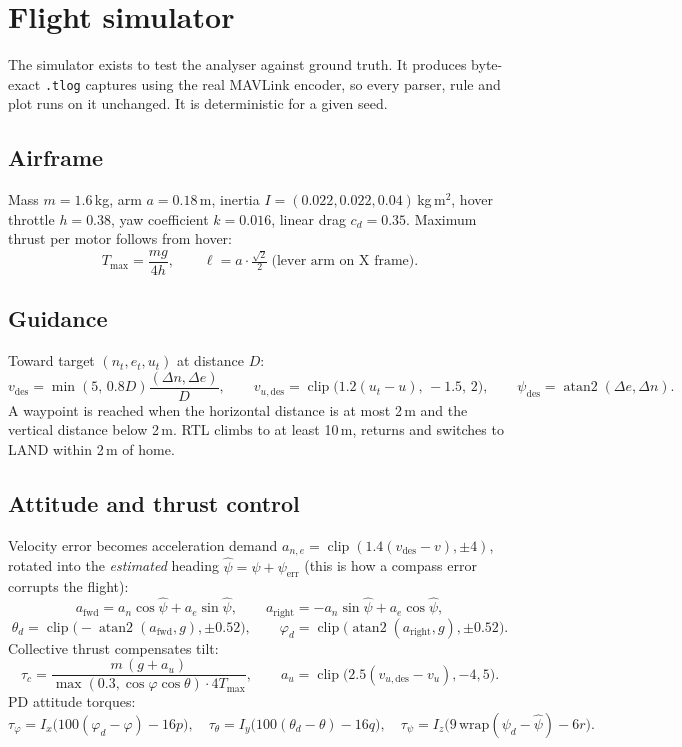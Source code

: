 \documentclass[11pt,a4paper]{article}
\newcommand{\code}[1]{\texttt{#1}}
\begin{document}
\section{Flight simulator}

The simulator exists to test the analyser against ground truth. It produces byte-exact
\code{.tlog} captures using the real MAVLink encoder, so every parser, rule and plot runs on it
unchanged. It is deterministic for a given seed.

\subsection{Airframe}
Mass $m=1.6$\,kg, arm $a=0.18$\,m, inertia $I=(0.022,0.022,0.04)$\,kg\,m$^2$, hover throttle
$h=0.38$, yaw coefficient $k=0.016$, linear drag $c_d=0.35$. Maximum thrust per motor follows
from hover:
\[
T_{\max}=\frac{mg}{4h},\qquad \ell=a\cdot\tfrac{\sqrt2}{2}\ \text{(lever arm on X frame)}.
\]

\subsection{Guidance}
Toward target $(n_t,e_t,u_t)$ at distance $D$:
\[
v_{\text{des}}=\min(5,\,0.8D)\frac{(\Delta n,\Delta e)}{D},\qquad
v_{u,\text{des}}=\operatorname{clip}\bigl(1.2(u_t-u),\,-1.5,\,2\bigr),\qquad
\psi_{\text{des}}=\operatorname{atan2}(\Delta e,\Delta n).
\]
A waypoint is reached when the horizontal distance is at most 2\,m and the vertical distance below 2\,m. RTL climbs to at
least 10\,m, returns and switches to LAND within 2\,m of home.

\subsection{Attitude and thrust control}
Velocity error becomes acceleration demand $a_{n,e}=\operatorname{clip}(1.4(v_{\text{des}}-v),\pm4)$,
rotated into the \emph{estimated} heading $\hat\psi=\psi+\psi_{\text{err}}$ (this is how a compass
error corrupts the flight):
\[
a_{\text{fwd}}=a_n\cos\hat\psi+a_e\sin\hat\psi,\qquad
a_{\text{right}}=-a_n\sin\hat\psi+a_e\cos\hat\psi,
\]
\[
\theta_d=\operatorname{clip}\!\bigl(-\operatorname{atan2}(a_{\text{fwd}},g),\pm0.52\bigr),\qquad
\varphi_d=\operatorname{clip}\!\bigl(\operatorname{atan2}(a_{\text{right}},g),\pm0.52\bigr).
\]
Collective thrust compensates tilt:
\[
\tau_c=\frac{m\,(g+a_u)}{\max(0.3,\cos\varphi\cos\theta)\cdot4T_{\max}},\qquad
a_u=\operatorname{clip}\bigl(2.5(v_{u,\text{des}}-v_u),-4,5\bigr).
\]
PD attitude torques:
\[
\tau_\varphi=I_x\bigl(100(\varphi_d-\varphi)-16p\bigr),\quad
\tau_\theta=I_y\bigl(100(\theta_d-\theta)-16q\bigr),\quad
\tau_\psi=I_z\bigl(9\,\mathrm{wrap}(\psi_d-\hat\psi)-6r\bigr).
\]
\end{document}

